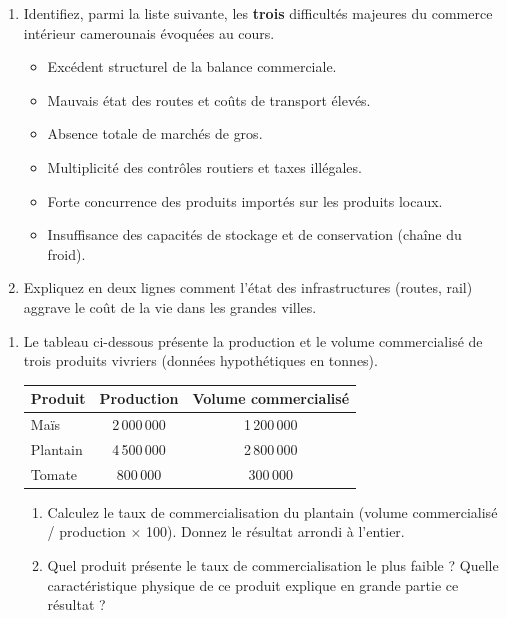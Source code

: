 \documentclass[11pt]{article}
\begin{document}
\begin{exercice}
\begin{enumerate}
    \item Identifiez, parmi la liste suivante, les \textbf{trois} difficultés majeures du commerce intérieur camerounais évoquées au cours.
    \begin{itemize}
        \item[$\square$] Excédent structurel de la balance commerciale.
        \item[$\square$] Mauvais état des routes et coûts de transport élevés.
        \item[$\square$] Absence totale de marchés de gros.
        \item[$\square$] Multiplicité des contrôles routiers et taxes illégales.
        \item[$\square$] Forte concurrence des produits importés sur les produits locaux.
        \item[$\square$] Insuffisance des capacités de stockage et de conservation (chaîne du froid).
    \end{itemize}
    \item Expliquez en deux lignes comment l'état des infrastructures (routes, rail) aggrave le coût de la vie dans les grandes villes.
\end{enumerate}
\end{exercice}

\begin{exercice}
\begin{enumerate}
    \item Le tableau ci-dessous présente la production et le volume commercialisé de trois produits vivriers (données hypothétiques en tonnes).
    \begin{tabular}{|l|c|c|}
        \hline
        \textbf{Produit} & \textbf{Production} & \textbf{Volume commercialisé} \\
        \hline
        Maïs & 2\,000\,000 & 1\,200\,000 \\
        Plantain & 4\,500\,000 & 2\,800\,000 \\
        Tomate & 800\,000 & 300\,000 \\
        \hline
    \end{tabular}
    \begin{enumerate}
        \item Calculez le taux de commercialisation du plantain (volume commercialisé / production $\times$ 100). Donnez le résultat arrondi à l'entier.
        \item Quel produit présente le taux de commercialisation le plus faible ? Quelle caractéristique physique de ce produit explique en grande partie ce résultat ?
    \end{enumerate}
\end{enumerate}
\end{exercice}
\end{document}
